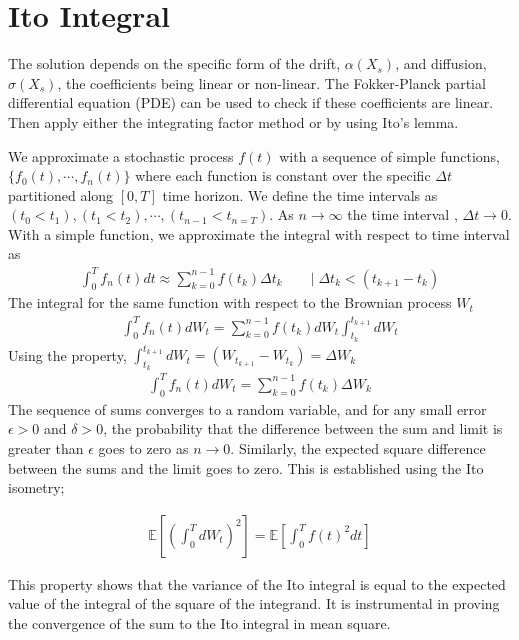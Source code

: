 \section{Ito Integral}
The solution depends on the specific form of the drift, $\alpha(X_s)$, and diffusion, $\sigma(X_s)$, the coefficients being linear or non-linear. The Fokker-Planck \cite{wiki:fokker-planck} partial differential equation (PDE) can be used to check if these coefficients are linear. Then apply either the integrating factor method or by using Ito's lemma.

We approximate a stochastic process $f(t)$ with a sequence of simple functions, $\{f_0(t),\cdots, f_n(t)\}$ where each  function is constant over the specific $\Delta t$ partitioned along $[0, T]$ time horizon. We define the time intervals as $(t_0 < t_1), (t_1< t_2), \cdots,(t_{n-1} < t_{n = T})$. As $n \rightarrow \infty$ the time interval , $\Delta t \rightarrow 0$.
With a simple function, we approximate the integral with respect to time interval as
\begin{align*}
\int_0^T f_n(t)dt \approx \sum_{k=0}^{n-1} f(t_k)\Delta t_k \qquad | \;\Delta t_k < (t_{k+1}-t_k) 
\end{align*}
The integral for the same function with respect to the Brownian process $W_t$
\begin{align*}
\int_0^T f_n(t)dW_t = \sum_{k=0}^{n-1} f(t_k)dW_t \int_{t_k}^{t_{k+1}} dW_t
\end{align*}
Using the property, $\int_{t_k}^{t_{k+1}} dW_t = \left(W_{t_{k+1}} - W_{t_k}\right) = \Delta W_k$ 
\begin{align*}
\int_0^T f_n(t)dW_t = \sum_{k=0}^{n-1} f(t_k)\Delta W_k
\end{align*}
The sequence of sums converges to a random variable, and for any small error $\epsilon > 0$ and $\delta > 0$, the probability that the difference between the sum and limit is greater than $\epsilon$ goes to zero as $n \rightarrow 0$. Similarly, the expected square difference between the sums and the limit goes to zero.
This is established using the Ito isometry;

\begin{align*}
\mathbb{E}\left[\left(\int_0^T dW_t \right)^2\right] = \mathbb{E}\left[\int_0^Tf(t)^2 dt\right]
\end{align*}

This property shows that the variance of the Ito integral \cite{wiki:ito-calculus} is equal to the expected value of the integral of the square of the integrand. It is instrumental in proving the convergence of the sum to the Ito integral in mean square.
\\\\
